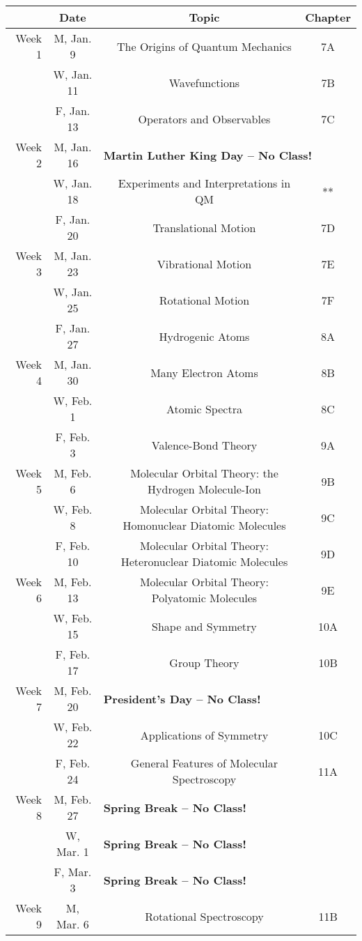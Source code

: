 \begin{tabular}{rcccc}
& Date && Topic & Chapter\\
\midrule
Week 1 & M, Jan. 9&& The Origins of Quantum Mechanics & 7A\\
& W, Jan. 11&& Wavefunctions & 7B\\
& F, Jan. 13&& Operators and Observables & 7C\\
\midrule
Week 2 & M, Jan. 16& \multicolumn{3}{l}{\textbf{Martin Luther King Day -- No Class!}}\\
& W, Jan. 18&& Experiments and Interpretations in QM & **\\
& F, Jan. 20&& Translational Motion & 7D\\
\midrule
Week 3 & M, Jan. 23&& Vibrational Motion & 7E\\
& W, Jan. 25&& Rotational Motion & 7F\\
& F, Jan. 27&& Hydrogenic Atoms & 8A\\
\midrule
Week 4 & M, Jan. 30&& Many Electron Atoms & 8B\\
& W, Feb. 1&& Atomic Spectra & 8C\\
& F, Feb. 3&& Valence-Bond Theory & 9A\\
\midrule
Week 5 & M, Feb. 6&& Molecular Orbital Theory: the Hydrogen Molecule-Ion & 9B\\
& W, Feb. 8&& Molecular Orbital Theory: Homonuclear Diatomic Molecules & 9C\\
& F, Feb. 10&& Molecular Orbital Theory: Heteronuclear Diatomic Molecules & 9D\\
\midrule
Week 6 & M, Feb. 13&& Molecular Orbital Theory: Polyatomic Molecules & 9E\\
& W, Feb. 15&& Shape and Symmetry & 10A\\
& F, Feb. 17&& Group Theory & 10B\\
\midrule
Week 7 & M, Feb. 20& \multicolumn{3}{l}{\textbf{President's Day -- No Class!}}\\
& W, Feb. 22&& Applications of Symmetry & 10C\\
& F, Feb. 24&& General Features of Molecular Spectroscopy & 11A\\
\midrule
Week 8 & M, Feb. 27& \multicolumn{3}{l}{\textbf{Spring Break -- No Class!}}\\
& W, Mar. 1& \multicolumn{3}{l}{\textbf{Spring Break -- No Class!}}\\
& F, Mar. 3& \multicolumn{3}{l}{\textbf{Spring Break -- No Class!}}\\
\midrule
Week 9 & M, Mar. 6&& Rotational Spectroscopy & 11B\\

\end{tabular}
